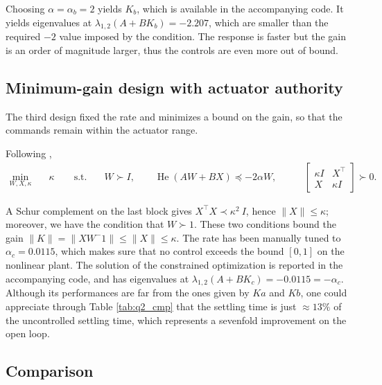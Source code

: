 \documentclass[10pt,a4paper]{scrartcl}
\begin{document}
Choosing $\alpha = \alpha_b = 2$ yields $K_b$, which is available in the accompanying code. It yields eigenvalues at $\lambda_{1,2}(A+BK_b)=-2.207$, which are smaller than the required $-2$ value imposed by the condition. The response is faster but the gain is an order of magnitude larger, thus the controls are even more out of bound. 

\subsection{Minimum-gain design with actuator authority}

The third design fixed the rate and minimizes a bound on the gain, so that the commands remain within the actuator range. 


Following
\citep[eq.~(27)]{zaccarian_lmi},
\begin{equation}
    \begin{aligned}
        \min_{W,X,\kappa}\quad & \kappa \qquad
        \text{s.t.}\quad & W\succ I,\qquad
            \operatorname{He}(AW+BX)\preceq-2\alpha W, \qquad
        & \begin{bmatrix} \kappa I & X^\top\\ X & \kappa I \end{bmatrix}\succ0 .
    \end{aligned}
    \label{eq:q2_lmi_c}
\end{equation}

A Schur complement on the last block gives $X^\top X \prec \kappa^2 \ I$, hence $\| X \| \le \kappa$; moreover, we have the condition that $W \succ 1$. These two conditions bound the gain $\| K \| = \|XW^-1\| \le \|X\| \le \kappa$. The rate has been manually tuned to $\alpha_c = 0.0115$, which makes sure that no control exceeds the bound $[0,1]$ on the nonlinear plant. The solution of the constrained optimization is reported in the accompanying code, and has eigenvalues at $\lambda_{1,2}(A+BK_c)=-0.0115=-\alpha_c$. Although its performances are far from the ones given by $Ka$ and $Kb$, one could appreciate through Table \ref{tab:q2_cmp} that the settling time is just $\approx 13\%$ of the uncontrolled settling time, which represents a sevenfold improvement on the open loop.

\subsection{Comparison}
\end{document}
